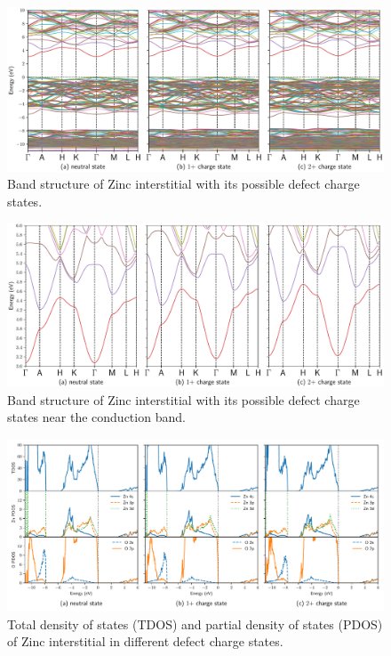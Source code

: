 \begin{figure}[tbph!]
	\centering
	\includegraphics[width=1\textwidth]{"images/rnd/Zn_i-band"}
	\caption[Band structure of Zinc interstitial with its possible defect charge states]{Band structure of Zinc interstitial with its possible defect charge states. }
	\label{fig:band-Zn_i}
\end{figure}

\begin{figure}[tbph!]
	\centering
	\includegraphics[width=1\textwidth]{"images/rnd/Zn_i-bandclose"}
	\caption[Band structure of Zinc interstitial with its possible defect charge states near the conduction band]{Band structure of Zinc interstitial with its possible defect charge states near the conduction band. }
	\label{fig:bandclose-Zn_i}
\end{figure}

\begin{figure}[t!]
	\centering
	\includegraphics[width=1\textwidth]{"images/rnd/Zn_i-dos"}
	\caption[Total density of states (TDOS) and partial density of states (PDOS) of Zinc interstitial in different  defect charge states]{Total density of states (TDOS) and partial density of states (PDOS) of Zinc interstitial in different  defect charge states.}
	\label{fig:dos-Zn_i}
\end{figure}



